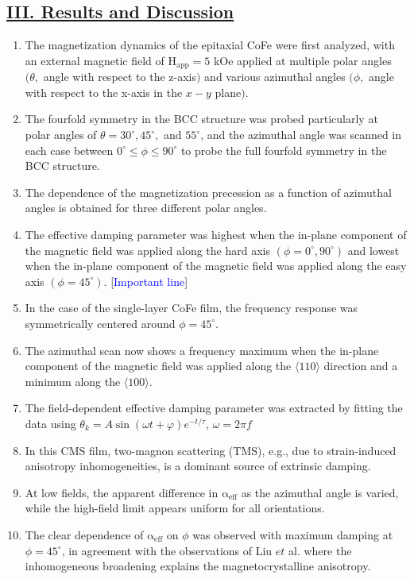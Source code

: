 \subsection*{\underline{III. Results and Discussion}}
\begin{enumerate}
    \item The magnetization dynamics of the epitaxial CoFe were first analyzed, with an external magnetic field of $\mathrm{H_{app}=5}$ kOe applied at multiple polar angles $(\theta,$ angle with respect to the z-axis$)$ and various azimuthal angles $(\phi,$ angle with respect to the x-axis in the $x-y$ plane$)$.
    \item The fourfold symmetry in the BCC structure was probed particularly at polar angles of $\theta=30^\circ,45^\circ,$ and $55^\circ$, and the azimuthal angle was scanned in each case between $0^\circ \leq \phi\leq 90^\circ$ to probe the full fourfold symmetry in the BCC structure.
    \item The dependence of the magnetization precession as a function of azimuthal angles is obtained for three different polar angles.
    \item The effective damping parameter was highest when the in-plane component of the magnetic field was applied along the hard axis $(\phi=0^\circ, 90^\circ)$ and lowest when the in-plane component of the magnetic field was applied along the easy axis  $(\phi=45^\circ)$. [\textcolor{blue}{Important line}]
    \item In the case of the single-layer CoFe film, the frequency response was symmetrically centered around $\phi=45^\circ$.
    \item The azimuthal scan now shows a frequency maximum when the in-plane component of the magnetic field was applied along the $\langle110\rangle$ direction and a minimum along the $\langle100\rangle$.
    \item The field-dependent effective damping parameter was extracted by fitting the data using $\theta_k=A \sin(\omega t+\varphi)e^{-t/\tau}$, $\omega=2\pi f$
    \item In this CMS film, two-magnon scattering (TMS), e.g., due to strain-induced anisotropy inhomogeneities, is a dominant source of extrinsic damping.
    \item At low fields, the apparent difference in $\mathrm{\alpha_{eff}}$ as the azimuthal angle is varied, while the high-field limit appears uniform for all orientations.
    \item The clear dependence of $\mathrm{\alpha_{eff}}$ on $\phi$ was observed with maximum damping at $\phi=45^\circ$, in agreement with the observations of Liu $et$ al. where the inhomogeneous broadening explains the magnetocrystalline anisotropy.

\end{enumerate}
